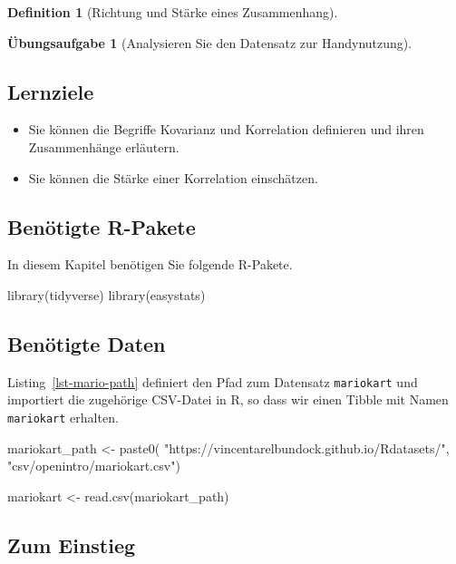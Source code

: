 \documentclass[
  a4paper,
  DIV=11]{scrreprt}
\newenvironment{Shaded}{\begin{snugshade}}{\end{snugshade}}
\newcommand{\FunctionTok}[1]{\textcolor[rgb]{0.28,0.35,0.67}{#1}}
\newcommand{\NormalTok}[1]{\textcolor[rgb]{0.00,0.23,0.31}{#1}}
\newcommand{\OtherTok}[1]{\textcolor[rgb]{0.00,0.23,0.31}{#1}}
\newcommand{\StringTok}[1]{\textcolor[rgb]{0.13,0.47,0.30}{#1}}
\providecommand{\tightlist}{%
  \setlength{\itemsep}{0pt}\setlength{\parskip}{0pt}}\usepackage{longtable,booktabs,array}
\theoremstyle{definition}
\newtheorem{exercise}{Übungsaufgabe}[chapter]
\theoremstyle{definition}
\theoremstyle{definition}
\newtheorem{definition}{Definition}[chapter]
\theoremstyle{remark}
\begin{document}
\begin{definition}[Richtung und Stärke eines
Zusammenhang]
\begin{exercise}[Analysieren Sie den Datensatz zur
Handynutzung]
\subsection{Lernziele}\label{lernziele-7}

\begin{itemize}
\tightlist
\item
  Sie können die Begriffe Kovarianz und Korrelation definieren und ihren
  Zusammenhänge erläutern.
\item
  Sie können die Stärke einer Korrelation einschätzen.
\end{itemize}

\subsection{Benötigte R-Pakete}\label{benuxf6tigte-r-pakete-5}

In diesem Kapitel benötigen Sie folgende R-Pakete.

\begin{Shaded}
\begin{Highlighting}[]
\FunctionTok{library}\NormalTok{(tidyverse)}
\FunctionTok{library}\NormalTok{(easystats)}
\end{Highlighting}
\end{Shaded}

\subsection{Benötigte Daten}\label{benuxf6tigte-daten-5}

Listing~\ref{lst-mario-path} definiert den Pfad zum Datensatz
\texttt{mariokart} und importiert die zugehörige CSV-Datei in R, so dass
wir einen Tibble mit Namen \texttt{mariokart} erhalten.

\begin{Shaded}
\begin{Highlighting}[]
\NormalTok{mariokart\_path }\OtherTok{\textless{}{-}} \FunctionTok{paste0}\NormalTok{(}
  \StringTok{"https://vincentarelbundock.github.io/Rdatasets/"}\NormalTok{,}
  \StringTok{"csv/openintro/mariokart.csv"}\NormalTok{)}

\NormalTok{mariokart }\OtherTok{\textless{}{-}} \FunctionTok{read.csv}\NormalTok{(mariokart\_path)}
\end{Highlighting}
\end{Shaded}

\subsection{Zum Einstieg}\label{zum-einstieg-2}


\end{exercise}
\end{definition}
\end{document}
